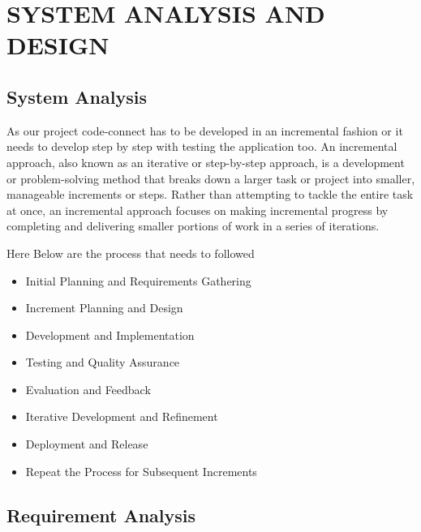 \chapter{SYSTEM ANALYSIS AND DESIGN}
\section{System Analysis}
As our project code-connect has to be developed in an incremental fashion or it needs to develop step by step with testing the application too. An incremental approach, also known as an iterative or step-by-step approach, is a development or problem-solving method that breaks down a larger task or project into smaller, manageable increments or steps. Rather than attempting to tackle the entire task at once, an incremental approach focuses on making incremental progress by completing and delivering smaller portions of work in a series of iterations.

Here Below are the process that needs to followed
\begin{itemize}
    \setlength\itemsep{0.25em}
    \item Initial Planning and Requirements Gathering
    \item Increment Planning and Design
    \item Development and Implementation
    \item Testing and Quality Assurance
    \item Evaluation and Feedback
    \item Iterative Development and Refinement
    \item Deployment and Release
    \item Repeat the Process for Subsequent Increments
\end{itemize}
\section{Requirement Analysis}
